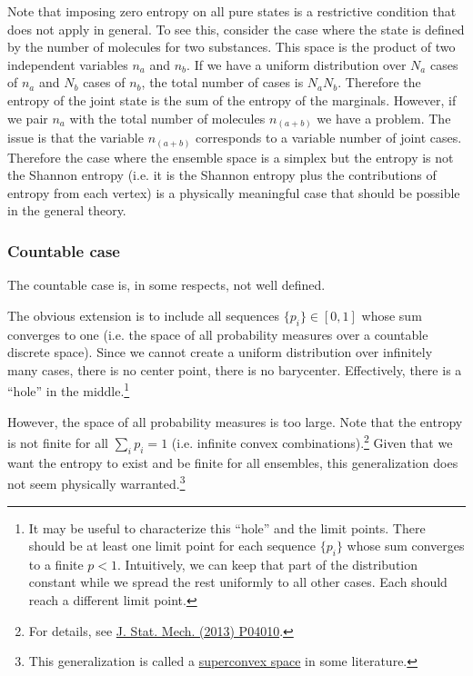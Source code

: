 Note that imposing zero entropy on all pure states is a restrictive condition that does not apply in general. To see this, consider the case where the state is defined by the number of molecules for two substances. This space is the product of two independent variables $n_a$ and $n_b$. If we have a uniform distribution over $N_a$ cases of $n_a$ and $N_b$ cases of $n_b$, the total number of cases is $N_a N_b$. Therefore the entropy of the joint state is the sum of the entropy of the marginals. However, if we pair $n_a$ with the total number of molecules $n_{(a+b)}$ we have a problem. The issue is that the variable $n_{(a+b)}$ corresponds to a variable number of joint cases. Therefore the case where the ensemble space is a simplex but the entropy is not the Shannon entropy (i.e. it is the Shannon entropy plus the contributions of entropy from each vertex) is a physically meaningful case that should be possible in the general theory.

\subsubsection{Countable case}

The countable case is, in some respects, not well defined.

The obvious extension is to include all sequences $\{p_i\} \in [0,1]$ whose sum converges to one (i.e. the space of all probability measures over a countable discrete space). Since we cannot create a uniform distribution over infinitely many cases, there is no center point, there is no barycenter. Effectively, there is a ``hole'' in the middle.\footnote{It may be useful to characterize this ``hole'' and the limit points. There should be at least one limit point for each sequence $\{p_i\}$ whose sum converges to a finite $p < 1$. Intuitively, we can keep that part of the distribution constant while we spread the rest uniformly to all other cases. Each should reach a different limit point.}

However, the space of all probability measures is too large. Note that the entropy is not finite for all $\sum_i p_i =1$ (i.e. infinite convex combinations).\footnote{For details, see \href{https://arxiv.org/pdf/1212.5630.pdf}{J. Stat. Mech. (2013) P04010}.} Given that we want the entropy to exist and be finite for all ensembles, this generalization does not seem physically warranted.\footnote{This generalization is called a   \href{https://ncatlab.org/nlab/show/superconvex+space}{superconvex space} in some literature.}

